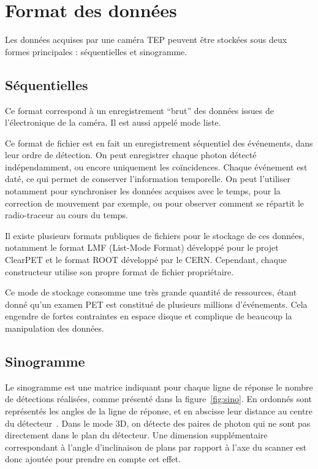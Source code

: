 	\section{Format des données}
Les données acquises par une caméra TEP peuvent être stockées sous deux formes principales : séquentielles et sinogramme.

		\subsection{Séquentielles}
\label{lab:modeliste}
Ce format correspond à un enregistrement ``brut'' des données issues de l'électronique de la caméra. Il est aussi appelé mode liste.

Ce format de fichier est en fait un enregistrement séquentiel des événements, dans leur ordre de détection. On peut enregistrer chaque photon détecté indépendamment, ou encore uniquement les coïncidences. Chaque événement est daté, ce qui permet de conserver l’information temporelle. On peut l'utiliser notamment pour synchroniser les données acquises avec le temps, pour la correction de mouvement par exemple, ou pour observer comment se répartit le radio-traceur au cours du temps.

Il existe plusieurs formats publiques de fichiers pour le stockage de ces données, notamment le format LMF (List-Mode Format) développé pour le projet ClearPET et le format ROOT développé par le CERN. Cependant, chaque constructeur utilise son propre format de fichier propriétaire.


Ce mode de stockage consomme une très grande quantité de ressources, étant donné qu'un examen PET est constitué de plusieurs millions d'événements. Cela engendre de fortes contraintes en espace disque et complique de beaucoup la manipulation des données. 

		\subsection{Sinogramme}

Le sinogramme est une matrice indiquant pour chaque ligne de réponse le nombre de détections réalisées, comme présenté dans la figure~\ref{fig:sino}. En ordonnés sont représentés les angles de la ligne de réponse, et en abscisse leur distance au centre du détecteur~\cite{fahey2002data}. Dans le mode 3D, on détecte des paires de photon qui ne sont pas directement dans le plan du détecteur. Une dimension supplémentaire correspondant à l'angle d'inclinaison de plans par rapport à l'axe du scanner est donc ajoutée pour prendre en compte cet effet.

